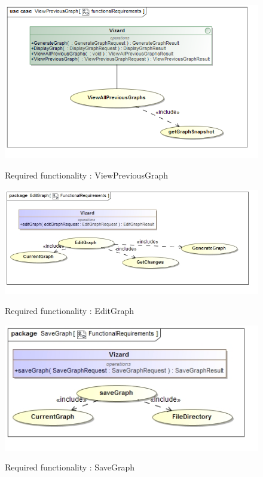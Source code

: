 \documentclass[a4paper,12pt]{article}
\begin{document}
	\begin{figure}[H]
		\includegraphics[width=\textwidth]{Images/uc__ViewPreviousGraph__functionalRequirements.png}  \\
		\caption{Required functionality : ViewPreviousGraph}
	\end{figure}	
	
	\begin{figure}[H]
		\includegraphics[width=\textwidth]{Images/uc__EditGraph}  \\
		\caption{Required functionality : EditGraph}
	\end{figure}
	
	\begin{figure}[H]
		\includegraphics[width=\textwidth]{Images/uc__SaveGraph}  \\
		\caption{Required functionality : SaveGraph}
	\end{figure}
	
\end{document}
